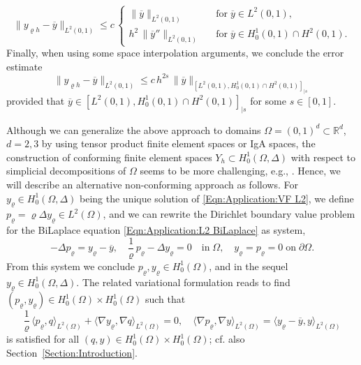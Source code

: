 \documentclass{article}
\numberwithin{equation}{section}
\begin{document}
\[
  \| y_{\varrho h} - \overline{y} \|_{L^2(0,1)} \leq c \,
  \left \{
    \begin{array}{ccl}
      \| \overline{y} \|_{L^2(0,1)}
      & & \mbox{for} \; \overline{y} \in L^2(0,1), \\[2mm]
      h^2 \, \| \overline{y}'' \|_{L^2(0,1)}
      & & \mbox{for} \; \overline{y} \in H^1_0(0,1) \cap H^2(0,1). 
    \end{array} \right.    
\]  
Finally, when using some space interpolation arguments, we conclude
the error estimate
\[
  \| y_{\varrho h} - \overline{y} \|_{L^2(0,1)} \leq
  c \, h^{2s} \, \| \overline{y} \|_{
    [L^2(0,1),H^1_0(0,1) \cap H^2(0,1)]_{|s}}
\]
provided that
$\overline{y} \in [L^2(0,1),H^1_0(0,1) \cap H^2(0,1)]_{|s}$
for some $s \in [0,1]$.

Although we can generalize the above approach to domains
$\Omega = (0,1)^d \subset {\mathbb{R}}^d$, $d=2,3$ %
by using tensor product finite element spaces or IgA spaces,
the construction of conforming
finite element spaces $Y_h \subset H^1_0(\Omega,\Delta)$ with respect to
simplicial decompositions of $\Omega$ seems to be more challenging,
e.g., \cite{AinsworthParker:2024}.
Hence, we will describe an alternative non-conforming approach as follows.
For $y_\varrho \in H^1_0(\Omega,\Delta)$ being the unique solution of \eqref{Eqn:Application:VF L2}, 
we define $p_\varrho = \varrho \Delta y_\varrho \in L^2(\Omega)$, and we can
rewrite the Dirichlet boundary value problem for the BiLaplace
equation \eqref{Eqn:Application:L2 BiLaplace} as system,
\[
  - \Delta p_\varrho = y_\varrho - \overline{y}, \quad
  \frac{1}{\varrho} \, p_\varrho - \Delta y_\varrho = 0 \quad \mbox{in} \;
  \Omega, \quad
  y_\varrho = p_\varrho = 0 \; \mbox{on} \; \partial \Omega .
\]
From this system we conclude $p_\varrho,y_\varrho \in H^1_0(\Omega)$,
and in the sequel $y_\varrho \in H^1_0(\Omega,\Delta)$.
The related variational formulation reads to find
$(p_\varrho , y_\varrho) \in H^1_0(\Omega) \times H^1_0(\Omega)$
such that
\begin{equation}\label{Eqn:Application:L2 System}
  \frac{1}{\varrho} \, \langle p_\varrho , q \rangle_{L^2(\Omega)} +
  \langle \nabla y_\varrho , \nabla q \rangle_{L^2(\Omega)} = 0, \quad
  \langle \nabla p_\varrho , \nabla y \rangle_{L^2(\Omega)} =
  \langle y_\varrho - \overline{y}, y \rangle_{L^2(\Omega)}
\end{equation}
is satisfied for all $(q,y) \in H^1_0(\Omega) \times H^1_0(\Omega)$;
cf. also Section~\ref{Section:Introduction}.
\end{document}
